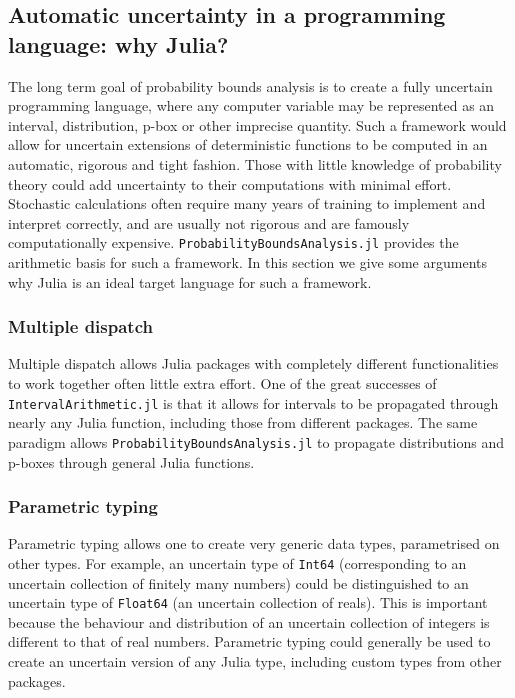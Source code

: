 \documentclass{juliacon}
\begin{document}
\subsection{Automatic uncertainty in a programming language: why Julia?}
The long term goal of probability bounds analysis is to create a fully uncertain programming language, where any computer variable may be represented as an interval, distribution, p-box or other imprecise quantity. Such a framework would allow for uncertain extensions of deterministic functions to be computed in an automatic, rigorous and tight fashion. Those with little knowledge of probability theory could add uncertainty to their computations with minimal effort. Stochastic calculations often require many years of training to implement and interpret correctly, and are usually not rigorous and are famously computationally expensive. \texttt{ProbabilityBoundsAnalysis.jl} provides the arithmetic basis for such a framework. In this section we give some arguments why Julia \cite{bezanson2017julia} is an ideal target language for such a framework.

\subsubsection{Multiple dispatch}
Multiple dispatch allows Julia packages with completely different functionalities to work together often little extra effort. One of the great successes of \texttt{IntervalArithmetic.jl} is that it allows for intervals to be propagated through nearly any Julia function, including those from different packages. The same paradigm allows \texttt{ProbabilityBoundsAnalysis.jl} to propagate distributions and p-boxes through general Julia functions.

\subsubsection{Parametric typing}
Parametric typing allows one to create very generic data types, parametrised on other types. For example, an uncertain type of \texttt{Int64} (corresponding to an uncertain collection of finitely many numbers) could be distinguished to an uncertain type of \texttt{Float64} (an uncertain collection of reals). This is important because the behaviour and distribution of an uncertain collection of integers is different to that of real numbers. Parametric typing could generally be used to create an uncertain version of any Julia type, including custom types from other packages.
\end{document}
